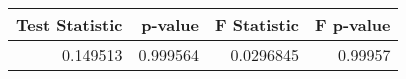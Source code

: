 \begin{tabular}{rrrr}
\toprule
   Test Statistic &   p-value &   F Statistic &   F p-value \\
\midrule
         0.149513 &  0.999564 &     0.0296845 &     0.99957 \\
\bottomrule
\end{tabular}